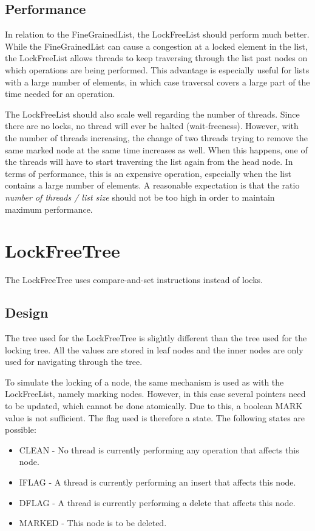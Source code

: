 \documentclass[a4paper]{article}
\begin{document}
\subsection{Performance}

In relation to the FineGrainedList, the LockFreeList should perform much better.
While the FineGrainedList can cause a congestion at a locked element in the list,
the LockFreeList allows threads to keep traversing through the list past nodes on
which operations are being performed. This advantage is especially useful for lists
with a large number of elements, in which case traversal covers a large part of the
time needed for an operation.

The LockFreeList should also scale well regarding the number of threads. Since there
are no locks, no thread will ever be halted (wait-freeness). However, with the number
of threads increasing, the change of two threads trying to remove the same marked node
at the same time increases as well. When this happens, one of the threads will have to
start traversing the list again from the head node. In terms of performance, this is an
expensive operation, especially when the list contains a large number of elements. A
reasonable expectation is that the ratio \emph{number of threads / list size} should
not be too high in order to maintain maximum performance.

\section{LockFreeTree}

The LockFreeTree uses compare-and-set instructions instead of locks.

\subsection{Design}

The tree used for the LockFreeTree is slightly different than the tree used for the
locking tree. All the values are stored in leaf nodes and the inner nodes are only used
for navigating through the tree.

To simulate the locking of a node, the same mechanism is used as with the LockFreeList,
namely marking nodes. However, in this case several pointers need to be updated, which 
cannot be done atomically. Due to this, a boolean MARK value is not sufficient. The flag
used is therefore a state. The following states are possible:
\begin{itemize}
\item CLEAN - No thread is currently performing any operation that affects this node.
\item IFLAG - A thread is currently performing an insert that affects this node.
\item DFLAG - A thread is currently performing a delete that affects this node.
\item MARKED - This node is to be deleted.
\end{itemize}
\end{document}
